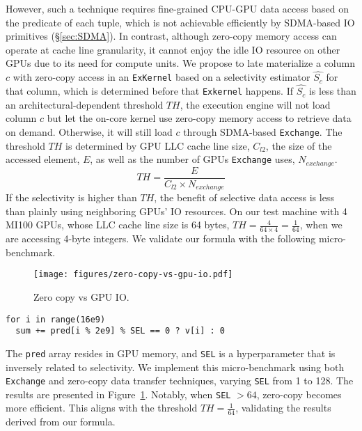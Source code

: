 However, such a technique requires fine-grained CPU-GPU data access based on the predicate of each tuple, which is not achievable efficiently by SDMA-based IO primitives (\S\ref{sec:SDMA}).
In contrast, although zero-copy memory access can operate at cache line granularity, it cannot enjoy the idle IO resource on other GPUs due to its need for compute units.
We propose to late materialize a column $c$ with zero-copy access in an \texttt{ExKernel} based on a selectivity estimator $\hat{S_c}$ for that column, which is determined before that \texttt{Exkernel} happens.
If $\hat{S_c}$ is less than an architectural-dependent threshold $TH$, the execution engine will not load column $c$ but let the on-core kernel use zero-copy memory access to retrieve data on demand. 
Otherwise, it will still load $c$ through SDMA-based \texttt{Exchange}.
The threshold $TH$ is determined by GPU LLC cache line size, $C_{l2}$, the size of the accessed element, $E$, as well as the number of GPUs \texttt{Exchange} uses, $N_{exchange}$.
$$
TH = \frac{E}{C_{l2} \times N_{exchange}}
$$
If the selectivity is higher than $TH$, the benefit of selective data access is less than plainly using neighboring GPUs' IO resources.
On our test machine with 4 MI100 GPUs, whose LLC cache line size is 64 bytes, $TH = \frac{4}{64 \times 4} = \frac{1}{64}$, when we are accessing 4-byte integers.
We validate our formula with the following micro-benchmark.
\begin{figure}[t]
    \centering
    \texttt{[image: figures/zero-copy-vs-gpu-io.pdf]}
    \caption{Zero copy vs GPU IO.}
    \label{fig:selectivity-perf}
\end{figure}

\begin{verbatim}
for i in range(16e9)
  sum += pred[i % 2e9] % SEL == 0 ? v[i] : 0
\end{verbatim}
The \texttt{pred} array resides in GPU memory, and \texttt{SEL} is a hyperparameter that is inversely related to selectivity. 
We implement this micro-benchmark using both \texttt{Exchange} and zero-copy data transfer techniques, varying \texttt{SEL} from 1 to 128. 
The results are presented in Figure~\ref{fig:selectivity-perf}. 
Notably, when \texttt{SEL} \(> 64\), zero-copy becomes more efficient. 
This aligns with the threshold \(TH = \frac{1}{64}\), validating the results derived from our formula.


